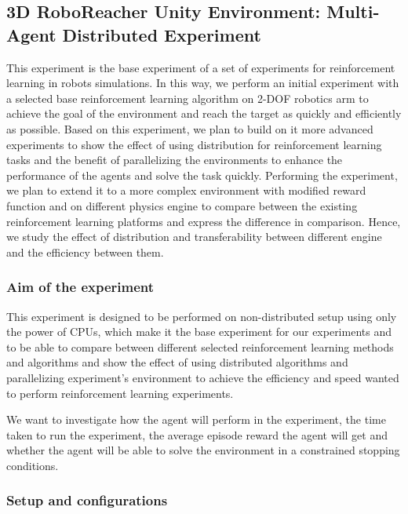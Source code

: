 
\subsection{3D RoboReacher Unity Environment: Multi-Agent Distributed Experiment}

This experiment is the base experiment of a set of experiments for reinforcement learning in robots simulations.
In this way, we perform an initial experiment with a selected base reinforcement learning algorithm on 2-DOF robotics arm to achieve the goal of the environment and reach the target as quickly and efficiently as possible.
Based on this experiment, we plan to build on it more advanced experiments to show the effect of using distribution for reinforcement learning tasks and the benefit of parallelizing the environments to enhance the performance of the agents and solve the task quickly. Performing the experiment, we plan to extend it to a more complex environment with modified reward function and on different physics engine to compare between the existing reinforcement learning platforms and express the difference in comparison. Hence, we study the effect of distribution and transferability between different engine and the efficiency between them.

\subsubsection{Aim of the experiment}

This experiment is designed to be performed on non-distributed setup using only the power of CPUs, which make it the base experiment for our experiments and to be able to compare between different selected reinforcement learning methods and algorithms and show the effect of using distributed algorithms and parallelizing experiment's environment to achieve the efficiency and speed wanted to perform reinforcement learning experiments. 

We want to investigate how the agent will perform in the experiment, the time taken to run the experiment, the average episode reward the agent will get and whether the agent will be able to solve the environment in a constrained stopping conditions.

\subsubsection{Setup and configurations}

